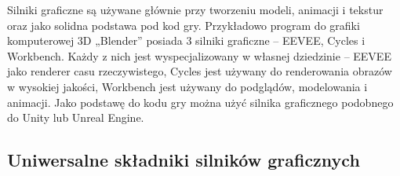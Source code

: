 \documentclass[12pt,twoside]{article}
\begin{document}
Silniki graficzne są używane głównie przy tworzeniu modeli, animacji i tekstur
oraz jako solidna podstawa pod kod gry. Przykładowo program do grafiki
komputerowej 3D „Blender” posiada 3 silniki graficzne -- EEVEE\cite{Blender:EEVEE}, Cycles\cite{Blender:Cycles}
i Workbench\cite{Blender:Workbench}. Każdy z nich jest wyspecjalizowany w własnej dziedzinie – EEVEE
jako renderer casu rzeczywistego, Cycles jest używany do renderowania obrazów w
wysokiej jakości, Workbench jest używany do podglądów, modelowania i animacji.
Jako podstawę do kodu gry można użyć silnika graficznego podobnego do Unity lub
Unreal Engine. 


\subsection{Uniwersalne składniki silników graficznych}
\end{document}
